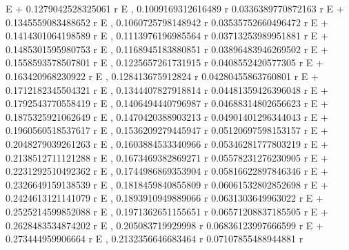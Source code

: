 \documentclass{article}
\begin{document}
    E                      + 0.1279042528325061 r E                     , 
     0.1009169312616489 r                         0.0336389770872163 r
    E                     + 0.1345559083488652 r E                    , 
     0.1060725798148942 r                         0.03535752660496472 r
    E                     + 0.1414301064198589 r E                     , 
     0.1113976196985564 r                         0.03713253989951881 r
    E                     + 0.1485301595980753 r E                     , 
     0.1168945183880851 r                         0.03896483946269502 r
    E                     + 0.1558593578507801 r E                     , 
     0.1225657261731915 r                        0.0408552420577305 r
    E                     + 0.163420968230922 r E                    , 
     0.128413675912824 r                         0.04280455863760801 r
    E                    + 0.1712182345504321 r E                     , 
     0.1344407827918814 r                         0.04481359426396048 r
    E                     + 0.1792543770558419 r E                     , 
     0.1406494440796987 r                         0.04688314802656623 r
    E                     + 0.1875325921062649 r E                     , 
     0.1470420388903213 r                         0.04901401296344043 r
    E                     + 0.1960560518537617 r E                     , 
     0.1536209279445947 r                         0.05120697598153157 r
    E                     + 0.2048279039261263 r E                     , 
     0.1603884533340966 r                         0.05346281777803219 r
    E                     + 0.2138512711121288 r E                     , 
     0.1673469382869271 r                         0.05578231276230905 r
    E                     + 0.2231292510492362 r E                     , 
     0.1744986869353904 r                         0.05816622897846346 r
    E                     + 0.2326649159138539 r E                     , 
     0.1818459840855809 r                         0.06061532802852698 r
    E                     + 0.2424613121141079 r E                     , 
     0.1893910949889066 r                         0.0631303649963022 r
    E                     + 0.2525214599852088 r E                    , 
     0.1971362651155651 r                         0.06571208837185505 r
    E                     + 0.2628483534874202 r E                     , 
     0.205083719929998 r                        0.06836123997666599 r
    E                    + 0.273444959906664 r E                     , 
     0.2132356646683464 r                         0.07107855488944881 r
\end{document}
